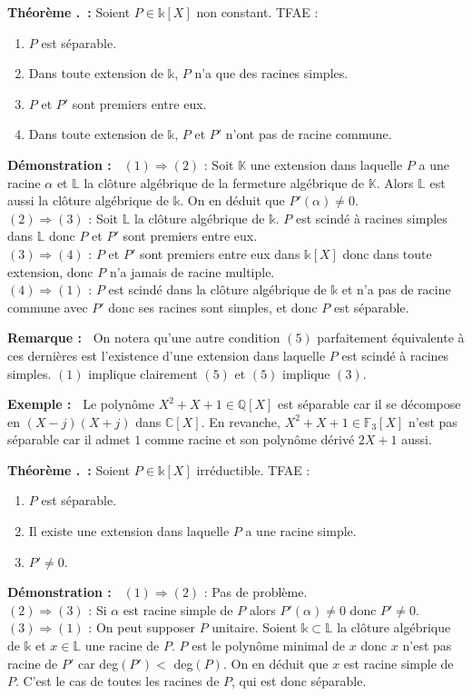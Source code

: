 \documentclass[5pt,a4paper]{article}
\newcounter{thm}[section]
\renewcommand{\thethm}{\thesection.\arabic{thm}}
\newcommand{\thmEnum}[1]{\stepcounter{thm}\noindent\textbf{Théorème \thethm ~:} #1}
\newcommand{\demo}[1]{\textbf{Démonstration :~} #1 \newline}
\newcommand{\rmq}[1]{\textbf{Remarque :~} #1 \newline}
\newcommand{\ex}[1]{\textbf{Exemple :~} #1 \newline}
\begin{document}
\begin{onehalfspacing}
\thmEnum{Soient $P \in \mathds{k}[X]$ non constant. TFAE :
	\begin{enumerate}
	\item $P$ est séparable.
	\item Dans toute extension de $\mathds{k}$, $P$ n'a que des racines simples.
	\item $P$ et $P'$ sont premiers entre eux.
	\item Dans toute extension de $\mathds{k}$, $P$ et $P'$ n'ont pas de racine commune.
	\end{enumerate}
}
\demo{$(1) \Rightarrow (2)$ : Soit $\mathbb{K}$ une extension dans laquelle $P$ a une racine $\alpha$ et $\mathbb{L}$ la clôture algébrique de la fermeture algébrique de $\mathbb{K}$. Alors $\mathbb{L}$ est aussi la clôture algébrique de $\mathds{k}$. On en déduit que $P'(\alpha) \neq 0$. 
\\$(2) \Rightarrow (3)$ : Soit $\mathbb{L}$ la clôture algébrique de $\mathds{k}$. $P$ est scindé à racines simples dans $\mathbb{L}$ donc $P$ et $P'$ sont premiers entre eux. 
\\$(3) \Rightarrow (4)$ : $P$ et $P'$ sont premiers entre eux dans $\mathds{k}[X]$ donc dans toute extension, donc $P$ n'a jamais de racine multiple. 
\\$(4) \Rightarrow (1)$ : $P$ est scindé dans la clôture algébrique de $\mathds{k}$ et n'a pas de racine commune avec $P'$ donc ses racines sont simples, et donc $P$ est séparable.}


\rmq{On notera qu'une autre condition $(5)$ parfaitement équivalente à ces dernières est l'existence d'une extension dans laquelle $P$ est scindé à racines simples. $(1)$ implique clairement $(5)$ et $(5)$ implique $(3)$.}


\ex{Le polynôme $X^2 + X + 1 \in \mathbb{Q}[X]$ est séparable car il se décompose en $(X - j)(X + j)$ dans $\mathbb{C}[X]$. En revanche, $X^2 + X + 1 \in \mathbb{F}_3[X]$ n'est pas séparable car il admet $1$ comme racine et son polynôme dérivé $2X + 1$ aussi.}


\thmEnum{Soient $P \in \mathds{k}[X]$ irréductible. TFAE :
	\begin{enumerate}
	\item $P$ est séparable.
	\item Il existe une extension dans laquelle $P$ a une racine simple.
	\item $P' \neq 0$.
	\end{enumerate}
}
\demo{$(1) \Rightarrow (2)$ : Pas de problème. 
\\$(2) \Rightarrow (3)$ : Si $\alpha$ est racine simple de $P$ alors $P'(\alpha) \neq 0$ donc $P' \neq 0$. 
\\$(3) \Rightarrow (1)$ : On peut supposer $P$ unitaire. Soient $\mathds{k} \subset \mathbb{L}$ la clôture algébrique de $\mathds{k}$ et $x \in \mathbb{L}$ une racine de $P$. $P$ est le polynôme minimal de $x$ donc $x$ n'est pas racine de $P'$ car deg$(P') < $ deg$(P)$. On en déduit que $x$ est racine simple de $P$. C'est le cas de toutes les racines de $P$, qui est donc séparable.}



\end{onehalfspacing}
\end{document}
